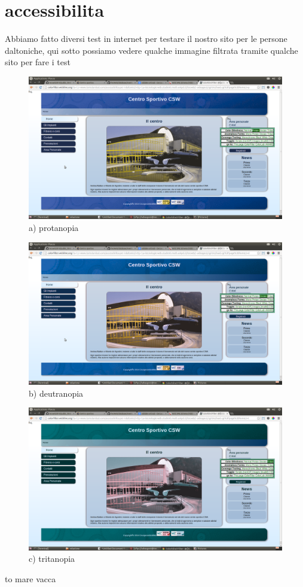 \section{accessibilita}
Abbiamo fatto diversi test in internet per testare il nostro sito per le persone daltoniche, qui sotto possiamo vedere qualche immagine filtrata tramite qualche sito per fare i test
\leavevmode \newline
\begin{figure}
	{\centering \includegraphics[height=0.3\textwidth]{images/protan.png} 
	\caption{a) protanopia}}
\end{figure}
\begin{figure}
	{\centering \includegraphics[height=0.3\textwidth]{images/deutran.png} 
	\caption{b) deutranopia} }
\end{figure}
\begin{figure}
	{\centering \includegraphics[height=0.3\textwidth]{images/tritan.png} 
	\caption{c) tritanopia}}
\end{figure}

to mare vacca
